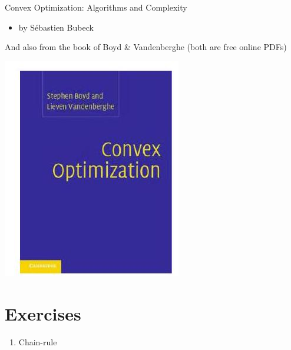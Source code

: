 \documentclass[10pt]{article}
\begin{document}
Convex Optimization: Algorithms and Complexity

\begin{itemize}
  \item by Sébastien Bubeck
\end{itemize}

And also from the book of Boyd \& Vandenberghe (both are free online PDFs)

\begin{center}
\includegraphics[max width=\textwidth]{2023_12_30_4ff132a3450066e65b4fg-24}
\end{center}

\section*{Exercises}
\begin{enumerate}
  \item Chain-rule
\end{enumerate}
\end{document}
